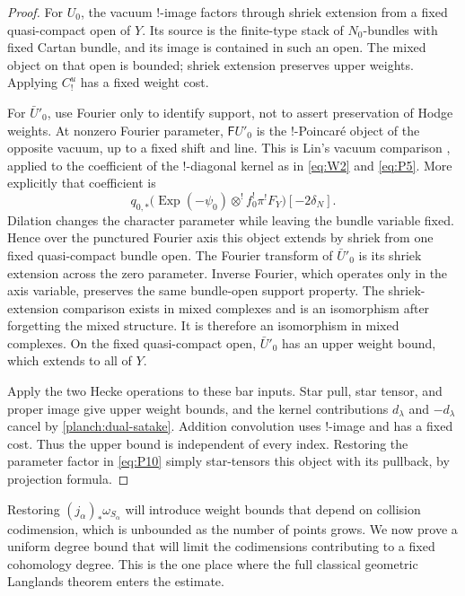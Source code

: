 \documentclass[11pt]{article}
\numberwithin{equation}{section}
\theoremstyle{definition}
\theoremstyle{remark}
\begin{document}
\begin{proof}
For $U_0$, the vacuum $!$-image factors through shriek extension from
a fixed quasi-compact open of $Y$.  Its source is the finite-type
stack of $N_0$-bundles with fixed Cartan bundle, and its image is
contained in such an open.  The mixed object on that open is bounded;
shriek extension preserves upper weights.  Applying $C_!^u$ has a
fixed weight cost.

For $\bar U'_0$, use Fourier only to identify support, not to assert
preservation of Hodge weights.  At nonzero Fourier parameter,
$\mathsf F U'_0$ is the $!$-Poincar\'e object of the opposite vacuum,
up to a fixed shift and line.  This is Lin's vacuum comparison
\cite[Theorem~9.0.2 and Section~8.1]{Lin}, applied to the coefficient
of the $!$-diagonal kernel as in \eqref{eq:W2} and \eqref{eq:P5}.
More explicitly that coefficient is
\[
 q_{0,*}\bigl(\operatorname{Exp}(-\psi_0)\otimes^!
                  f_0^!\pi^!F_Y\bigr)[-2\delta_N].
\]
Dilation changes the character parameter while leaving the bundle
variable fixed.  Hence over the punctured Fourier axis this object
extends by shriek from one fixed quasi-compact bundle open.
The Fourier transform of $\bar U'_0$ is its shriek extension across
the zero parameter.  Inverse Fourier, which operates only in the
axis variable, preserves the same bundle-open support property.
The shriek-extension comparison exists in mixed complexes and is an
isomorphism after forgetting the mixed structure.  It is therefore
an isomorphism in mixed complexes.  On the fixed quasi-compact open,
$\bar U'_0$ has an upper weight bound, which extends to all of $Y$.

Apply the two Hecke operations to these bar inputs.  Star pull,
star tensor, and proper image give upper weight bounds, and the
kernel contributions $d_\lambda$ and $-d_\lambda$ cancel by
\eqref{planch:dual-satake}.  Addition convolution uses $!$-image and
has a fixed cost.  Thus the upper bound is independent of every
index.  Restoring the parameter factor in \eqref{eq:P10} simply
star-tensors this object with its pullback, by projection formula.
\end{proof}

Restoring $(j_\alpha)_*\omega_{S_\alpha}$ will introduce weight bounds
that depend on collision codimension, which is unbounded as the number
of points grows.  We now prove a uniform degree bound that will limit
the codimensions contributing to a fixed cohomology degree.  This is
the one place where the full classical geometric Langlands theorem
enters the estimate.
\end{document}
